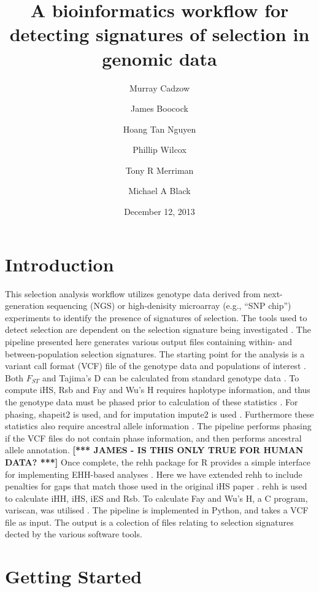 \documentclass[a4paper,10pt]{article}
\title{\textbf{A bioinformatics workflow for detecting signatures of selection in genomic data}}
\date{December 12, 2013}
\author[1]{Murray Cadzow}
\author[1]{James Boocock}
\author[1,2]{Hoang Tan Nguyen}
\author[1,3]{Phillip Wilcox}
\author[1]{Tony R Merriman}
\author[1]{Michael A Black}
\affil[1]{Department of Biochemistry, University of Otago}
\affil[2]{Department of Mathematics and Statistics, University of Otago}
\affil[3]{Scion Research, Rotorua, New Zealand}
\begin{document}
\maketitle{}\textmd{}
\tableofcontents

\pagebreak
\section{Introduction}

This selection analysis workflow utilizes genotype data derived from
next-generation sequencing (NGS) or high-denisity microarray (e.g.,
``SNP chip'') experiments to identify the presence of signatures of
selection. The tools used to detect selection are dependent on the
selection signature being investigated \citep{Sabeti:2006ha}. The
pipeline presented here generates various output files containing
within- and between-population selection signatures. The starting
point for the analysis
is a variant call format (VCF) file of the genotype data and
populations of interest \citep{Danecek:2011gz}. Both $F_{ST}$ and
Tajima's D can be calculated from standard genotype data
\citep{Weir:1984vn, Tajima:1989un}. To compute iHS, Rsb and Fay
and Wu's H requires haplotype information, and thus the genotype data must be
phased prior to calculation of these statistics \citep{Voight:2006go,
  Gautier:2012et,fayandwush}. For phasing, shapeit2 is
used, and for imputation impute2 is used \citep{impute22009,
  Delaneau:2013hi}. Furthermore these statistics also require
ancestral allele information \citep{Flicek:2012vg}.  The pipeline
performs phasing if the VCF files do not contain phase information, and
then performs ancestral allele annotation. 
{\bf\color{blue}\small [*** JAMES - IS THIS ONLY TRUE FOR HUMAN DATA?  ***]}
Once complete, the rehh
package for R provides a simple interface for implementing EHH-based
analyses \citep{Gautier:2012et}. Here we have extended rehh to include penalties
for gaps that match those used in the original iHS paper
\citep{Voight:2006go}. rehh is used to calculate iHH, iHS, iES and Rsb. To
calculate Fay and Wu's H, a C program, variscan, was utilised
\citep{variscan2005}. The pipeline is implemented in Python, and takes a VCF
file as input. The output is a colection of files relating to selection
signatures dected by the various software tools.

\section{Getting Started}
\end{document}
